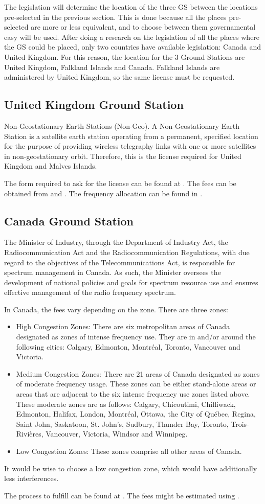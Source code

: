 The legislation will determine the location of the three GS between the locations pre-selected in the previous section. This is done because all the places pre-selected are more or less equivalent, and to choose between them governamental easy will be used. After doing a research on the legislation of all the places where the GS could be placed, only two countries have available legislation: Canada and United Kingdom. For this reason, the location for the 3 Ground Stations are United Kingdom, Falkland Islands and Canada. Falkland Islands are administered by United Kingdom, so the same license must be requested.

\subsection{United Kingdom Ground Station}
Non-Geostationary Earth Stations (Non-Geo). A Non-Geostationary Earth Station is a satellite earth station operating from a permanent, specified location for the purpose of providing wireless telegraphy links with one or more satellites in non-geostationary orbit. Therefore, this is the license required for United Kingdom and Malves Islands.

The form required to ask for the license can be found at \cite{UKForm}. The fees can be obtained from \cite{UKFees} and \cite{UKMHzFees}. The frequency allocation can be found in \cite{UKAllocation}.

\subsection{Canada Ground Station}
The Minister of Industry, through the Department of Industry Act, the Radiocommunication Act and the Radiocommunication Regulations, with due regard to the objectives of the Telecommunications Act, is responsible for spectrum management in Canada. As such, the Minister oversees the development of national policies and goals for spectrum resource use and ensures effective management of the radio frequency spectrum.

In Canada, the fees vary depending on the zone. There are three zones:
\begin{itemize}
\item High Congestion Zones: There are six metropolitan areas of Canada designated as zones of intense frequency use. They are in and/or around the following cities: Calgary, Edmonton, Montréal, Toronto, Vancouver and Victoria.
\item Medium Congestion Zones: There are 21 areas of Canada designated as zones of moderate frequency usage. These zones can be either stand-alone areas or areas that are adjacent to the six intense frequency use zones listed above. These moderate zones are as follows: Calgary, Chicoutimi, Chilliwack, Edmonton, Halifax, London, Montréal, Ottawa, the City of Québec, Regina, Saint John, Saskatoon, St. John's, Sudbury, Thunder Bay, Toronto, Trois-Rivières, Vancouver, Victoria, Windsor and Winnipeg.
\item Low Congestion Zones: These zones comprise all other areas of Canada.
\end{itemize}

It would be wise to choose a low congestion zone, which would have additionally less interferences. 

The process to fulfill can be found at \cite{CndForm}. The fees might be estimated using \cite{CndFees}.